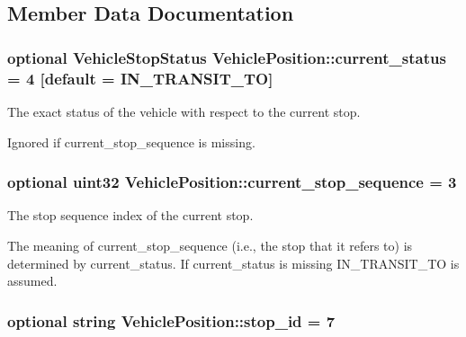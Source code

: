 \subsection{Member Data Documentation}
\subsubsection[{\texorpdfstring{current\+\_\+status}{current_status}}]{\setlength{\rightskip}{0pt plus 5cm}optional {\bf Vehicle\+Stop\+Status} Vehicle\+Position\+::current\+\_\+status = 4 \mbox{[}default = {\bf I\+N\+\_\+\+T\+R\+A\+N\+S\+I\+T\+\_\+\+TO}\mbox{]}}\hypertarget{structVehiclePosition_ad900e7ee70d8271d8fd096233b0560f3}{}\label{structVehiclePosition_ad900e7ee70d8271d8fd096233b0560f3}


The exact status of the vehicle with respect to the current stop. 

Ignored if current\+\_\+stop\+\_\+sequence is missing. 
\subsubsection[{\texorpdfstring{current\+\_\+stop\+\_\+sequence}{current_stop_sequence}}]{\setlength{\rightskip}{0pt plus 5cm}optional uint32 Vehicle\+Position\+::current\+\_\+stop\+\_\+sequence = 3}\hypertarget{structVehiclePosition_a2fde6125d13fbc9fabc8f48eada1d038}{}\label{structVehiclePosition_a2fde6125d13fbc9fabc8f48eada1d038}


The stop sequence index of the current stop. 

The meaning of current\+\_\+stop\+\_\+sequence (i.\+e., the stop that it refers to) is determined by current\+\_\+status. If current\+\_\+status is missing I\+N\+\_\+\+T\+R\+A\+N\+S\+I\+T\+\_\+\+TO is assumed. 
\subsubsection[{\texorpdfstring{stop\+\_\+id}{stop_id}}]{\setlength{\rightskip}{0pt plus 5cm}optional string Vehicle\+Position\+::stop\+\_\+id = 7}\hypertarget{structVehiclePosition_a4b7ba68aab943efc93017657f40867f9}{}\label{structVehiclePosition_a4b7ba68aab943efc93017657f40867f9}


